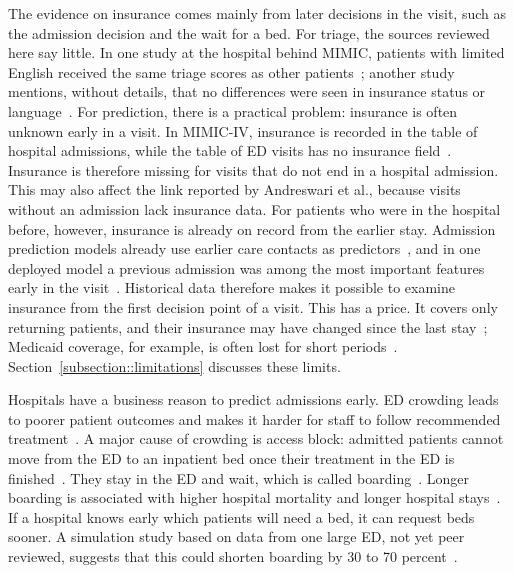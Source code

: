 The evidence on insurance comes mainly from later decisions in the visit, such as the admission decision and the wait for a bed. For triage, the sources reviewed here say little. In one study at the hospital behind MIMIC, patients with limited English received the same triage scores as other patients~\cite{schulson2018emergency}; another study mentions, without details, that no differences were seen in insurance status or language~\cite{joseph2022association}. For prediction, there is a practical problem: insurance is often unknown early in a visit. In MIMIC-IV, insurance is recorded in the table of hospital admissions, while the table of ED visits has no insurance field~\cite{mimicdocs}. Insurance is therefore missing for visits that do not end in a hospital admission. This may also affect the link reported by Andreswari et al., because visits without an admission lack insurance data. For patients who were in the hospital before, however, insurance is already on record from the earlier stay. Admission prediction models already use earlier care contacts as predictors~\cite{brink2022predicting}, and in one deployed model a previous admission was among the most important features early in the visit~\cite{king2022machine}. Historical data therefore makes it possible to examine insurance from the first decision point of a visit. This has a price. It covers only returning patients, and their insurance may have changed since the last stay~\cite{mimicdocs}; Medicaid coverage, for example, is often lost for short periods~\cite{venkatesh2019association}. Section~\ref{subsection::limitations} discusses these limits.

Hospitals have a business reason to predict admissions early. ED crowding leads to poorer patient outcomes and makes it harder for staff to follow recommended treatment~\cite{morley2018emergency}. A major cause of crowding is access block: admitted patients cannot move from the ED to an inpatient bed once their treatment in the ED is finished~\cite{morley2018emergency}. They stay in the ED and wait, which is called boarding~\cite{singer2011association}. Longer boarding is associated with higher hospital mortality and longer hospital stays~\cite{singer2011association}. If a hospital knows early which patients will need a bed, it can request beds sooner. A simulation study based on data from one large ED, not yet peer reviewed, suggests that this could shorten boarding by 30 to 70 percent~\cite{cheng2026proactive}.

